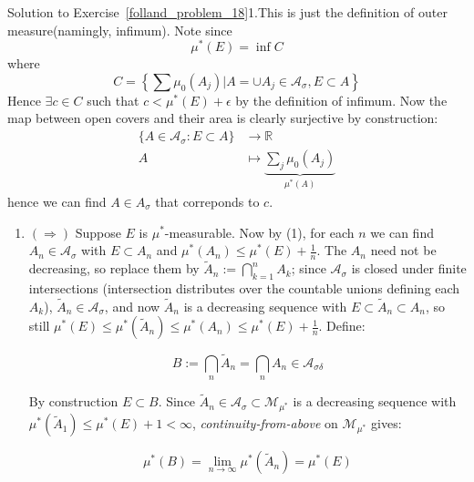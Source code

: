 \begin{mystsolution}{Solution to Exercise~\ref{folland_problem_18}}1.This is just the definition of outer measure(namingly, infimum). Note since
\begin{equation}
\mu^*(E)= \inf C
\end{equation}
where
\begin{equation}
C= \left\{\sum \mu_0(A_j) | A=\cup A_j\in \mathcal A_{\sigma}, E\subset A \right\}
\end{equation}
Hence $\exists c\in C$ such that $c < \mu^*(E)+\epsilon$ by the definition of infimum. Now the map between open covers and their area is clearly surjective by construction:
\begin{equation}
\begin{aligned}
\{A\in \mathcal A_{\sigma} : E\subset A\} &\to \mathbb{R} \\
A &\mapsto \underbrace{\sum_j \mu_0(A_j)}_{\mu^*(A)}
\end{aligned}
\end{equation}
hence we can find $A\in A_{\sigma}$ that correponds to $c$.

\begin{enumerate}[resume]
\item $(\Longrightarrow)$ Suppose $E$ is $\mu^*$-measurable. Now by (1), for each $n$ we can find $A_n\in \mathcal A_{\sigma}$ with $E\subset A_n$ and $\mu^*(A_n)\leq \mu^*(E)+\frac1n$. The $A_n$ need not be decreasing, so replace them by $\tilde A_n:=\bigcap_{k=1}^n A_k$; since $\mathcal A_\sigma$ is closed under finite intersections (intersection distributes over the countable unions defining each $A_k$), $\tilde A_n\in\mathcal A_\sigma$, and now $\tilde A_n$ is a decreasing sequence with $E\subset \tilde A_n\subset A_n$, so still $\mu^*(E)\leq \mu^*(\tilde A_n)\leq \mu^*(A_n)\leq \mu^*(E)+\frac1n$. Define:

\begin{equation}
B:=\bigcap_{n}\tilde A_{n} = \bigcap_n A_n \in \mathcal A_{\sigma \delta}
\end{equation}


By construction $E\subset B$. Since $\tilde A_n \in \mathcal A_\sigma \subset \mathcal M_{\mu^*}$ is a decreasing sequence with $\mu^*(\tilde A_1)\leq \mu^*(E)+1<\infty$, \textit{continuity-from-above} on $\mathcal M_{\mu^*}$ gives:

\begin{equation}
\mu^*(B)=\lim_{n \to \infty}\mu^*(\tilde A_n)=\mu^*(E)
\end{equation}



\end{enumerate}
\end{mystsolution}
